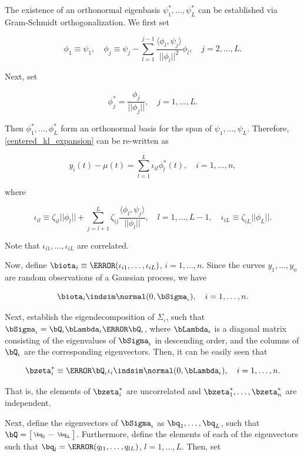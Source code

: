 \documentclass[12pt]{article}
\theoremstyle{plain}
\theoremstyle{definition}
\theoremstyle{remark}
\begin{document}
\noindent The existence of an orthonormal eigenbasis $\psi^*_1, \dots, \psi^*_L$ can be established via Gram-Schmidt
orthogonalization. We first set

\[
	\phi_1 \equiv \psi_1, \quad
	\phi_j \equiv \psi_j - \sum_{l=1}^{j-1} \frac{\langle \phi_l, \psi_j \rangle}{|| \phi_l ||^2} \phi_l, \quad j = 2, \dots, L.
\]

\noindent Next, set

\[
	\phi^*_j = \frac{\phi_j}{|| \phi_j ||}, \quad j = 1, \dots, L.
\]

\noindent Then $\phi^*_1, \dots, \phi^*_L$ form an orthonormal basis for the span of $\psi_1, \dots, \psi_L$. Therefore,
\eqref{centered_kl_expansion} can be re-written as

\[
	y_i (t) - \mu (t) = \sum_{l=1}^L \iota_{il} \phi^*_l (t), \quad i = 1, \dots, n,
\]

\noindent where

\[
	\iota_{il} \equiv \zeta_{il} ||\phi_l|| + \sum_{j=l+1}^L \zeta_{ij} \frac{\langle \phi_l , \psi_j \rangle}{||\phi_l||}, \quad
	l = 1, \dots, L-1, \quad
	\iota_{iL} \equiv \zeta_{iL} ||\phi_L||.
\]

\noindent Note that $\iota_{i1}, \dots, \iota_{iL}$ are correlated.

Now, define $\biota_i \equiv \T{(\iota_{i1}, \dots, \iota_{iL})}$, $i = 1, \dots, n$. Since the curves $y_1, \dots, y_n$ are
random observations of a Gaussian process, we have

\[
	\biota_i \indsim \normal (0, \bSigma_\iota), \quad i = 1, \dots, n.
\]

\noindent Next, establish the eigendecomposition of $\Sigma_\iota$, such
that $\bSigma_\iota = \bQ_\iota \bLambda_\iota \T{\bQ_\iota}$, where $\bLambda_\iota$
is a diagonal matrix consisting of the eigenvalues of
$\bSigma_\iota$ in descending order, and the columns of $\bQ_\iota$
are the corresponding eigenvectors. Then, it can be easily seen that

\[
	\bzeta^*_i \equiv \T{\bQ_\iota} \iota_i \indsim \normal (0, \bLambda_\iota), \quad i = 1, \dots, n.
\]

\noindent That is, the elements of $\bzeta^*_i$ are uncorrelated and $\bzeta^*_1, \dots, \bzeta^*_n$ are independent.

Next, define the eigenvectors of $\bSigma_\iota$ as $\bq_1, \dots, \bq_L$, such that $\bQ = \bigl[
\begin{smallmatrix} \bq_1 & \cdots & \bq_L \end{smallmatrix} \bigr]$. Furthermore, define the elements of each of
the eigenvectors such that $\bq_l = \T{( q_{l1}, \dots, q_{lL} )}$, $l = 1, \dots, L$. Then, set
\end{document}
